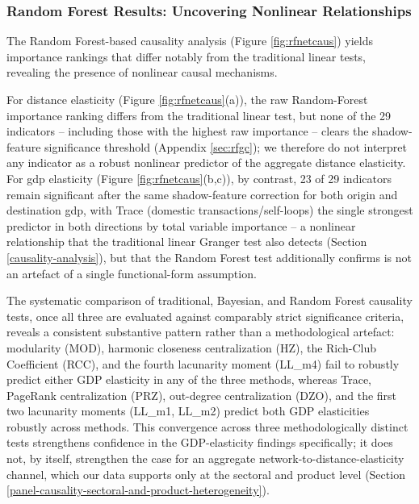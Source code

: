 \documentclass[preprint, 3p,
authoryear]{elsarticle} %
\begin{document}
\subsubsection{Random Forest Results: Uncovering Nonlinear
Relationships}\label{random-forest-results-uncovering-nonlinear-relationships}

The Random Forest-based causality analysis (Figure \ref{fig:rfnetcaus})
yields importance rankings that differ notably from the traditional
linear tests, revealing the presence of nonlinear causal mechanisms.

For distance elasticity (Figure \ref{fig:rfnetcaus}(a)), the raw
Random-Forest importance ranking differs from the traditional linear
test, but none of the 29 indicators -- including those with the highest
raw importance -- clears the shadow-feature significance threshold
(Appendix \ref{sec:rfgc}); we therefore do not interpret any indicator
as a robust nonlinear predictor of the aggregate distance elasticity.
For \gls{gdp} elasticity (Figure \ref{fig:rfnetcaus}(b,c)), by contrast,
23 of 29 indicators remain significant after the same shadow-feature
correction for both origin and destination \gls{gdp}, with Trace
(domestic transactions/self-loops) the single strongest predictor in
both directions by total variable importance -- a nonlinear relationship
that the traditional linear Granger test also detects (Section
\ref{causality-analysis}), but that the Random Forest test additionally
confirms is not an artefact of a single functional-form assumption.

The systematic comparison of traditional, Bayesian, and Random Forest
causality tests, once all three are evaluated against comparably strict
significance criteria, reveals a consistent substantive pattern rather
than a methodological artefact: modularity (MOD), harmonic closeness
centralization (HZ), the Rich-Club Coefficient (RCC), and the fourth
lacunarity moment (LL\_m4) fail to robustly predict either GDP
elasticity in any of the three methods, whereas Trace, PageRank
centralization (PRZ), out-degree centralization (DZO), and the first two
lacunarity moments (LL\_m1, LL\_m2) predict both GDP elasticities
robustly across methods. This convergence across three methodologically
distinct tests strengthens confidence in the GDP-elasticity findings
specifically; it does not, by itself, strengthen the case for an
aggregate network-to-distance-elasticity channel, which our data
supports only at the sectoral and product level (Section
\ref{panel-causality-sectoral-and-product-heterogeneity}).
\end{document}
